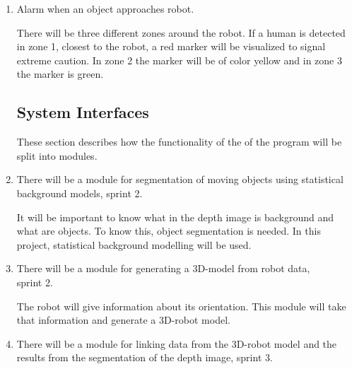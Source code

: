 \documentclass[10pt,a4paper]{article}
\begin{document}
\begin{enumerate}
\item Alarm when an object approaches robot.

There will be three different zones around the robot. If a human is detected in zone 1, closest to the robot, a red marker will be visualized to signal extreme caution. In zone 2 the marker will be of color yellow and in zone 3 the marker is green.

%


\subsection{System Interfaces}
These section describes how the functionality of the of the program will be split into modules.

\item There will be a module for segmentation of moving objects using statistical background models, sprint 2.

{\addtolength{\leftskip}{5mm}It will be important to know what in the depth image is background and what are objects. To know this, object segmentation is needed. In this project, statistical background modelling will be used.\par}

\item There will be a module for generating a 3D-model from robot data,\\ sprint 2.
 
{\addtolength{\leftskip}{5mm}The robot will give information about its orientation. This module will take that information and generate a 3D-robot model.\par}
 
\item There will be a module for linking data from the 3D-robot model and the results from the segmentation of the depth image, sprint 3.


\end{enumerate}
\end{document}
